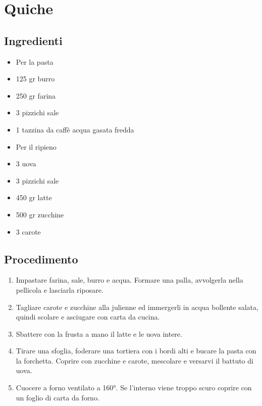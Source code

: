 \section{Quiche}
\subsection{Ingredienti}
\begin{itemize}
\item Per la pasta  
\item 125 gr burro   
\item 250 gr farina  
\item 3 pizzichi sale  
\item 1 tazzina da caffè acqua gasata fredda  
\item Per il ripieno  
\item 3 uova  
\item 3 pizzichi sale  
\item 450 gr latte   
\item 500 gr zucchine  
\item 3 carote
\end{itemize}
\subsection{Procedimento}
\begin{enumerate}
\item  Impastare farina, sale, burro e acqua. Formare una palla, avvolgerla nella pellicola e lasciarla riposare.  
\item  Tagliare carote e zucchine alla julienne ed immergerli in acqua bollente salata, quindi scolare e asciugare con carta da cucina.   
\item  Sbattere con la frusta a mano il latte e le uova intere.  
\item  Tirare una sfoglia, foderare una tortiera con i bordi alti e bucare la pasta con la forchetta. Coprire con zucchine e carote, mescolare e versarvi il battuto di uova.  
\item  Cuocere a forno ventilato a 160°. Se l'interno viene troppo scuro coprire con un foglio di carta da forno.
\end{enumerate}
